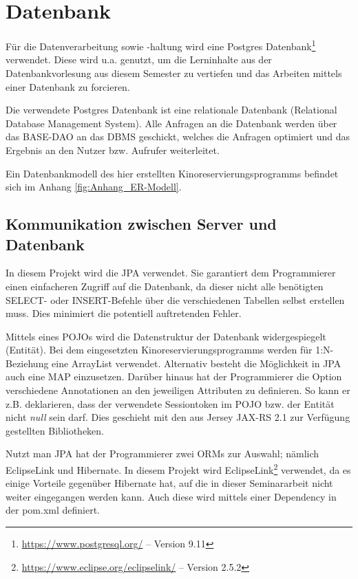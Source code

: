 \section{Datenbank}
\label{sec:datenbank}
Für die Datenverarbeitung sowie -haltung wird eine Postgres Datenbank\footnote{\url{https://www.postgresql.org/} -- Version 9.11} verwendet.
Diese wird u.a. genutzt, um die Lerninhalte aus der Datenbankvorlesung aus diesem Semester zu vertiefen und das Arbeiten mittels einer Datenbank zu forcieren.

Die verwendete Postgres Datenbank ist eine relationale Datenbank (Relational Database Management System).
Alle Anfragen an die Datenbank werden über das BASE-\acs{DAO} an das \acs{DBMS} geschickt, welches die Anfragen optimiert und das Ergebnis an den Nutzer bzw. Aufrufer weiterleitet.

Ein Datenbankmodell des hier erstellten Kinoreservierungsprogramms befindet sich im Anhang \vref{fig:Anhang_ER-Modell}. 

\subsection{Kommunikation zwischen Server und Datenbank}
\label{ssec:jpa}
In diesem Projekt wird die \ac{JPA} verwendet.
Sie garantiert dem Programmierer einen einfacheren Zugriff auf die Datenbank, da dieser nicht alle benötigten SELECT- oder INSERT-Befehle über die verschiedenen Tabellen selbst erstellen muss.
Dies minimiert die potentiell auftretenden Fehler.

Mittels eines \acp{POJO} wird die Datenstruktur der Datenbank widergespiegelt (Entität). Bei dem eingesetzten Kinoreservierungsprogramms werden für 1:N-Beziehung eine ArrayList verwendet.
Alternativ besteht die Möglichkeit in \ac{JPA} auch eine MAP einzusetzen.
Darüber hinaus hat der Programmierer die Option verschiedene Annotationen an den jeweiligen Attributen zu definieren.
So kann er z.B. deklarieren, dass der verwendete Sessiontoken im \ac{POJO} bzw. der Entität nicht \textit{null} sein darf.
Dies geschieht mit den aus Jersey JAX-RS 2.1 zur Verfügung gestellten Bibliotheken.

Nutzt man \ac{JPA} hat der Programmierer zwei \acp{ORM} zur Auswahl; nämlich EclipseLink und Hibernate.
In diesem Projekt wird EclipseLink\footnote{\url{https://www.eclipse.org/eclipselink/} -- Version 2.5.2} verwendet, da es einige Vorteile gegenüber Hibernate hat, auf die in dieser Seminararbeit nicht weiter eingegangen werden kann.
Auch diese wird mittels einer Dependency in der pom.xml definiert.

